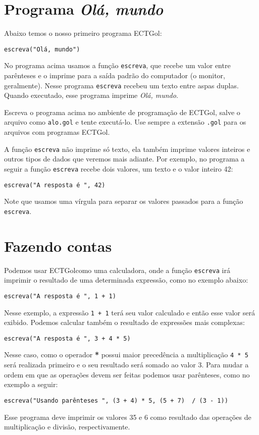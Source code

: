\documentclass{report}
\newcommand{\Egol}{ECTGol\;}
\begin{document}
\section{Programa \emph{Olá, mundo}}

Abaixo temos o nosso primeiro programa \Egol:
%
\begin{verbatim}
escreva("Olá, mundo")
\end{verbatim}
%
No programa acima usamos a função \texttt{escreva},
que recebe um valor entre parênteses e o imprime para
a saída padrão do computador (o monitor, geralmente).
Nesse programa \texttt{escreva} recebeu um texto entre aspas
duplas. Quando executado, esse programa imprime \emph{Olá, mundo}.  

Escreva o programa acima no ambiente de programação de \Egol,
salve o arquivo como \texttt{alo.gol} e tente executá-lo.
Use sempre a extensão \texttt{.gol} para os arquivos com
programas \Egol.

A função \texttt{escreva} não imprime só texto, ela também
imprime valores inteiros e outros tipos de dados que veremos
mais adiante. Por exemplo, no programa a seguir a função
\texttt{escreva} recebe dois valores, um texto e o valor
inteiro 42:
%
\begin{verbatim}
escreva("A resposta é ", 42)
\end{verbatim}
%
Note que usamos uma vírgula para separar os
valores passados para a função \texttt{escreva}.


\section{Fazendo contas}

Podemos usar \Egol como uma calculadora, onde a função
\texttt{escreva} irá imprimir o resultado de uma determinada
expressão, como no exemplo abaixo:
%
\begin{verbatim}
escreva("A resposta é ", 1 + 1)
\end{verbatim}
%
Nesse exemplo, a expressão \texttt{1 + 1} terá seu valor
calculado e então esse valor será exibido. Podemos calcular
também o resultado de expressões mais complexas:
\begin{verbatim}
escreva("A resposta é ", 3 + 4 * 5)
\end{verbatim}
% 
Nesse caso, como o operador \textbf{*} possui maior precedência
a multiplicação \texttt{4 * 5} será realizada primeiro e o seu
resultado será somado ao valor 3.
%
Para mudar a ordem em que as operações devem ser feitas podemos
usar parênteses, como no exemplo a seguir:
\begin{verbatim}
escreva("Usando parênteses ", (3 + 4) * 5, (5 + 7)  / (3 - 1))
\end{verbatim}
%
Esse programa deve imprimir os valores 35 e 6 como resultado
das operações de multiplicação e divisão, respectivamente.
\end{document}
